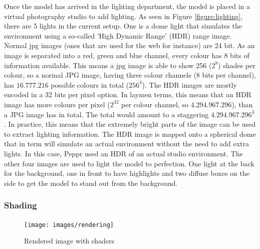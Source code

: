 Once the model has arrived in the lighting department, the model is placed in a virtual photography studio to add lighting. As seen in Figure \ref{figure:lighting}, there are 5 lights in the current setup. One is a dome light that simulates the environment using a so-called 'High Dynamic Range' (HDR) range image. Normal jpg images (ones that are used for the web for instance) are 24 bit. As an image is separated into a red, green and blue channel, every colour has 8 bits of information available. This means a jpg image is able to show 256 ($2^8$) shades per colour, so a normal JPG image, having three colour channels (8 bits per channel), has $16.777.216$ possible colours in total ($256^3$). \newline
The HDR images are mostly encoded in a 32 bits per pixel option. In laymen terms, this means that an HDR image has more colours per pixel ($2^32$ per colour channel, so $4.294.967.296$), than a JPG image has in total. The total would amount to a staggering $4.294.967.296 ^ 3$. In practice, this means that the extremely bright parts of the image can be used to extract lighting information. The HDR image is mapped onto a spherical dome that in term will simulate an actual environment without the need to add extra lights. In this case, Peppr used an HDR of an actual studio environment.
 The other four images are used to light the model to perfection. One light at the back for the background, one in front to have highlights and two diffuse boxes on the side to get the model to stand out from the background.


\subsubsection{Shading}

\begin{figure}
\vspace{-1cm}
\centering
\texttt{[image: images/rendering]}
\caption{Rendered image with shaders}
\label{figure:lighting_rendered}
\end{figure}

